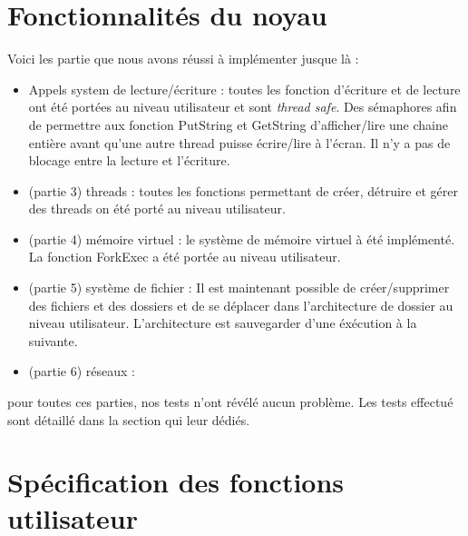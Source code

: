 \documentclass{article}
\begin{document}
\section{Fonctionnalités du noyau}
	Voici les partie que nous avons réussi à implémenter jusque là :
	\begin{itemize}
		\item Appels system de lecture/écriture : toutes les fonction d'écriture et de lecture ont été portées au niveau utilisateur et sont \emph{thread safe}. Des sémaphores afin de permettre aux fonction PutString et GetString d'afficher/lire une chaine entière avant qu'une autre thread puisse écrire/lire à l'écran. Il n'y a pas de blocage entre la lecture et l'écriture.
		\item (partie 3) threads : toutes les fonctions permettant de créer, détruire et gérer des threads on été porté au niveau utilisateur.
		\item (partie 4) mémoire virtuel : le système de mémoire virtuel à été implémenté. La fonction ForkExec a été portée au niveau utilisateur.
		\item (partie 5) système de fichier : Il est maintenant possible de créer/supprimer des fichiers et des dossiers et de se déplacer dans l'architecture de dossier au niveau utilisateur. L'architecture est sauvegarder d'une éxécution à la suivante.
		\item (partie 6) réseaux : 
	\end{itemize}
	pour toutes ces parties, nos tests n'ont révélé aucun problème. Les tests effectué sont détaillé dans la section qui leur dédiés.

\section{Spécification des fonctions utilisateur}
\end{document}

